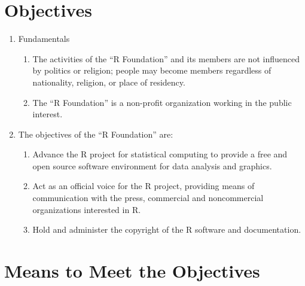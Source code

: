 \documentclass[a4paper]{article}
\newcommand{\RF}{``R Foundation''}
\begin{document}
\section{Objectives}

\begin{enumerate}
 \item Fundamentals
  \begin{enumerate}
   \item The activities of the \RF{} and its members are not
    influenced by politics or religion; people may become members
    regardless of nationality, religion, or place of residency.
   \item The \RF{} is a non-profit organization working in
    the public interest.
  \end{enumerate}
 \item The objectives of the \RF{} are:
  \begin{enumerate}
   \item Advance the R project for statistical computing to provide a
    free and open source software environment for data analysis and
    graphics. 
   \item Act as an official voice for the R project, providing means of
    communication with the press, commercial and noncommercial
    organizations interested in R.
   \item Hold and administer the copyright of the R software and
    documentation.
  \end{enumerate}
\end{enumerate}

\section{Means to Meet the Objectives}
\end{document}
